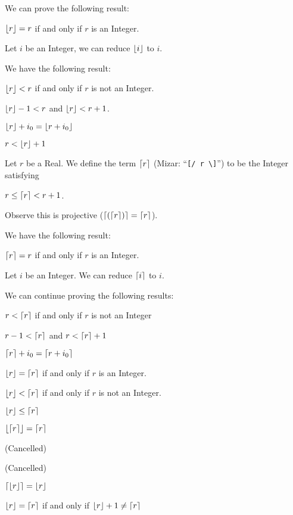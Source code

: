 \documentclass{article}
\begin{document}
We can prove the following result:
\begin{thm}
\item\label{int1:25} $\lfloor r \rfloor=r$ if and only if $r$ is an Integer.
\end{thm}

Let $i$ be an Integer, we can reduce $\lfloor i \rfloor$ to $i$.

We have the following result:
\begin{thm}
\item\label{int1:26} $\lfloor r \rfloor<r$ if and only if $r$ is not an Integer.
\item\label{int1:27} $\lfloor r \rfloor-1<r$ and $\lfloor r \rfloor<r+1$.
\item\label{int1:28} $\lfloor r \rfloor+i_{0}=\lfloor r+i_{0} \rfloor$
\item\label{int1:29} $r<\lfloor r \rfloor+1$
\end{thm}

\begin{definition}
Let $r$ be a Real.
We define the term $\lceil r \rceil$ (Mizar: ``\verb#[/ r \]#'') to be the
Integer satisfying
\begin{defn}
\item $r\leq\lceil r \rceil<r+1$. 
\end{defn}
Observe this is projective ($\lceil (\lceil r \rceil) \rceil=\lceil r \rceil$).
\end{definition}

We have the following result:
\begin{thm}
\item\label{int1:30} $\lceil r \rceil=r$ if and only if $r$ is an Integer.
\end{thm}

Let $i$ be an Integer. We can reduce $\lceil i \rceil$ to $i$.

We can continue proving the following results:
\begin{thm}
\item\label{int1:31} $r<\lceil r \rceil$ if and only if $r$ is not an Integer
\item\label{int1:32} $r-1<\lceil r \rceil$ and $r<\lceil r \rceil+1$
\item\label{int1:33} $\lceil r \rceil+i_{0}=\lceil r+i_{0} \rceil$
\item\label{int1:34} $\lfloor r \rfloor=\lceil r \rceil$ if and only if $r$ is an Integer.
\item\label{int1:35} $\lfloor r \rfloor<\lceil r \rceil$ if and only if $r$ is not an Integer.
\item\label{int1:36} $\lfloor r \rfloor\leq\lceil r \rceil$
\item\label{int1:37} $\lfloor \lceil r \rceil \rfloor=\lceil r \rceil$
\item\label{int1:38} (Cancelled)
\item\label{int1:39} (Cancelled)
\item\label{int1:40} $\lceil \lfloor r \rfloor \rceil=\lfloor r \rfloor$
\item\label{int1:41} $\lfloor r \rfloor=\lceil r \rceil$ if and only if $\lfloor r \rfloor+1\neq\lceil r \rceil$
\end{thm}
\end{document}
